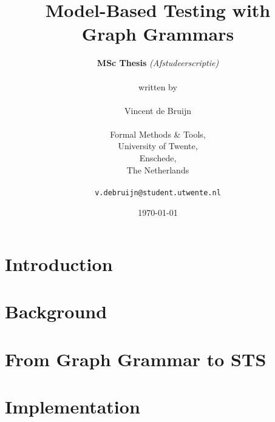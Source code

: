 \documentclass[a4paper]{report}
\theoremstyle{definition}
\begin{document}
	\title{\textbf{Model-Based Testing with\\Graph Grammars}}
	\author{\textbf{MSc Thesis} \textit{(Afstudeerscriptie)}\\
	\\
	written by
	\\
	\\
	Vincent de Bruijn\\
	\\
	Formal Methods \& Tools,\\
	University of Twente,
	\\Enschede,\\
	The Netherlands\\
	\\
	\texttt{v.debruijn@student.utwente.nl}}
	\date{\today}
	\maketitle
	
	
	
	\newpage
	\tableofcontents
  \newpage

  \newpage
	\chapter{Introduction}\label{chapter:introduction}
	
	
	
	\newpage
	\chapter{Background}\label{chapter:background}
	
	
	
	
	
	
	
	
	\newpage
	\chapter{From Graph Grammar to STS}\label{chapter:gg_to_sts}
	
	
	
  \chapter{Implementation}
	
	
\end{document}
